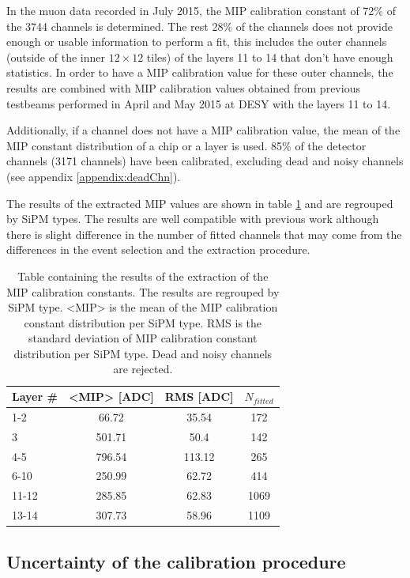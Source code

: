 In the muon data recorded in July 2015, the MIP calibration constant of 72\% of the 3744 channels is determined. The rest 28\% of the channels does not provide enough or usable information to perform a fit, this includes the outer channels (outside of the inner $12 \times 12$ tiles) of the layers 11 to 14 that don't have enough statistics. In order to have a MIP calibration value for these outer channels, the results are combined with MIP calibration values obtained from previous testbeams performed in April and May 2015 at DESY with the layers 11 to 14.

Additionally, if a channel does not have a MIP calibration value, the mean of the MIP constant distribution of a chip or a layer is used. 85\% of the detector channels (3171 channels) have been calibrated, excluding dead and noisy channels (see appendix \ref{appendix:deadChn}).

The results of the extracted MIP values are shown in table \ref{table:MIPAHCAL} and are regrouped by SiPM types. The results are well compatible with previous work \cite{SarahMaster} although there is slight difference in the number of fitted channels that may come from the differences in the event selection and the extraction procedure.

\begin{table}[htb!]
	\centering
	\caption{Table containing the results of the extraction of the MIP calibration constants. The results are regrouped by SiPM type. <MIP> is the mean of the MIP calibration constant distribution per SiPM type. RMS is the standard deviation of MIP calibration constant distribution per SiPM type. Dead and noisy channels are rejected.}
	\label{table:MIPAHCAL}
	\begin{tabular}{@{} lccc @{}}
		\toprule
		Layer \# & <MIP> [ADC] & RMS [ADC] & $N_{fitted}$\\
		\midrule
		1-2 & 66.72 & 35.54 & 172\\
		3 & 501.71 & 50.4 & 142\\
		4-5 & 796.54 & 113.12 & 265\\
		6-10 & 250.99 & 62.72 & 414\\
		11-12 & 285.85 & 62.83 & 1069\\
		13-14 & 307.73 & 58.96 & 1109\\
		\bottomrule
	\end{tabular}
\end{table}

\subsection{Uncertainty of the calibration procedure}

